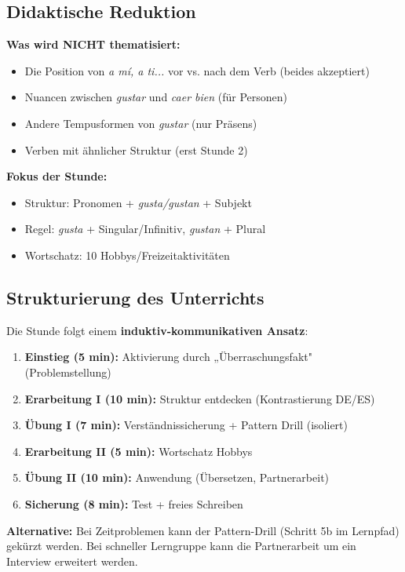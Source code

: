 \documentclass[11pt, a4paper]{article}
\newcommand{\es}[1]{\textcolor{spanisch}{\textit{#1}}}
\begin{document}
\subsection{Didaktische Reduktion}

\textbf{Was wird NICHT thematisiert:}
\begin{itemize}[leftmargin=2em]
    \item Die Position von \es{a mí, a ti...} vor vs. nach dem Verb (beides akzeptiert)
    \item Nuancen zwischen \es{gustar} und \es{caer bien} (für Personen)
    \item Andere Tempusformen von \es{gustar} (nur Präsens)
    \item Verben mit ähnlicher Struktur (erst Stunde 2)
\end{itemize}

\textbf{Fokus der Stunde:}
\begin{itemize}[leftmargin=2em]
    \item Struktur: Pronomen + \es{gusta/gustan} + Subjekt
    \item Regel: \es{gusta} + Singular/Infinitiv, \es{gustan} + Plural
    \item Wortschatz: 10 Hobbys/Freizeitaktivitäten
\end{itemize}

\subsection{Strukturierung des Unterrichts}

Die Stunde folgt einem \textbf{induktiv-kommunikativen Ansatz}:

\begin{enumerate}[leftmargin=2em]
    \item \textbf{Einstieg (5 min):} Aktivierung durch „Überraschungsfakt" (Problemstellung)
    \item \textbf{Erarbeitung I (10 min):} Struktur entdecken (Kontrastierung DE/ES)
    \item \textbf{Übung I (7 min):} Verständnissicherung + Pattern Drill (isoliert)
    \item \textbf{Erarbeitung II (5 min):} Wortschatz Hobbys
    \item \textbf{Übung II (10 min):} Anwendung (Übersetzen, Partnerarbeit)
    \item \textbf{Sicherung (8 min):} Test + freies Schreiben
\end{enumerate}

\textbf{Alternative:} Bei Zeitproblemen kann der Pattern-Drill (Schritt 5b im Lernpfad) gekürzt werden. Bei schneller Lerngruppe kann die Partnerarbeit um ein Interview erweitert werden.
\end{document}
